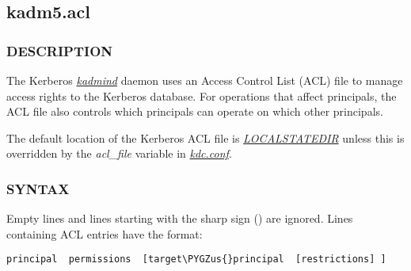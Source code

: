 \documentclass[letterpaper,10pt,english]{sphinxmanual}
\def\PYGZus{\char`\_}
\begin{document}
\subsection{kadm5.acl}
\label{admin/conf_files/kadm5_acl:kadm5-acl}\label{admin/conf_files/kadm5_acl:kadm5-acl-5}\label{admin/conf_files/kadm5_acl::doc}

\subsubsection{DESCRIPTION}
\label{admin/conf_files/kadm5_acl:description}
The Kerberos {\hyperref[admin/admin_commands/kadmind:kadmind-8]{\emph{kadmind}}} daemon uses an Access Control List
(ACL) file to manage access rights to the Kerberos database.
For operations that affect principals, the ACL file also controls
which principals can operate on which other principals.

The default location of the Kerberos ACL file is
{\hyperref[mitK5defaults:paths]{\emph{LOCALSTATEDIR}}}  unless this is overridden by the \emph{acl\_file}
variable in {\hyperref[admin/conf_files/kdc_conf:kdc-conf-5]{\emph{kdc.conf}}}.


\subsubsection{SYNTAX}
\label{admin/conf_files/kadm5_acl:syntax}
Empty lines and lines starting with the sharp sign (\code{\#}) are
ignored.  Lines containing ACL entries have the format:

\begin{Verbatim}[commandchars=\\\{\}]
principal  permissions  [target\PYGZus{}principal  [restrictions] ]
\end{Verbatim}
\end{document}
